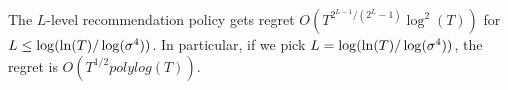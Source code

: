 \begin{comment}

   \draw[dashed] (0+0.4,6)--(6.4,7.5);  	
   \draw[dashed] (3+0.4,6)--(6.4,7.5);  	
  \node at (6,1.5)[rotate = 90]{$\cdots$};
  \node at (-1,1.5)[rotate = 90]{$\cdots$};
  \node at (6,9.5)[rotate = 90]{$\cdots$};
  \node at (-1,9.5)[rotate = 90]{$\cdots$};
  \node at(-1.2,0.5){\textbf{Level 1}};
  \node at(-1.2,3){\textbf{Level $l-2$}};
  \node at(-1.2,5.5){\textbf{Level $l-1$}};
  \node at(-1.2,8){\textbf{Level $l$}};
  \node at(-1.2,10.5){\textbf{Level $L$}};
  \draw[->] (13.3,0)--(13.3,12);
  \node at(13.7,6)[ rotate=90]{Time};
  \draw [rounded corners=5mm, line width=1mm, red](-0.2,1.75)--(12,1.75)--(12,9)--(-0.2,9)--cycle;\draw [rounded corners=2.5mm, line width=0.5mm, brown](5.9,6.5)--(8.9,6.5)--(8.9,8.8)--(5.9,8.8)--cycle;
\end{tikzpicture}
\caption{$l$-level Recommendation Policy.}
\label{fig:llevel}
\end{figure}
\end{comment}

\begin{theorem}
\label{thm:llevel}
The $L$-level recommendation policy gets regret $O\left(T^{2^{L-1}/(2^L-1)} \log^2(T) \right)$ for $L \leq \log(\ln(T)/\log(\sigma^4))$. In particular, if we pick $L = \log(\ln(T)/\log(\sigma^4))$, the regret is $O(T^{1/2} polylog(T))$.
\end{theorem}


